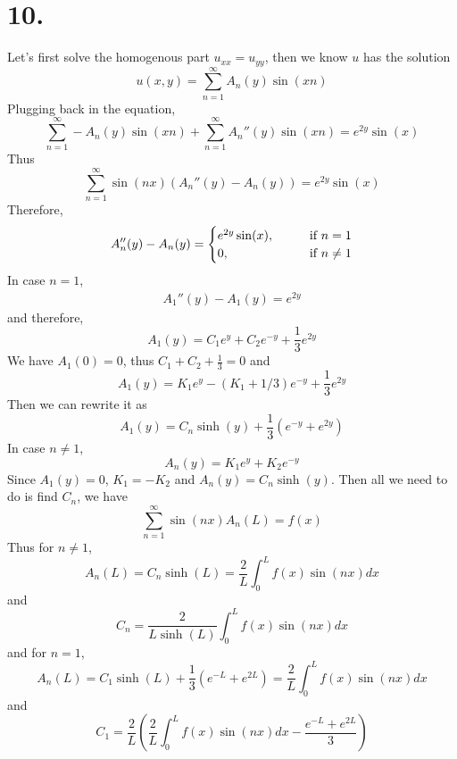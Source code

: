 \documentclass[11pt]{article}
\theoremstyle{mystyle}
\theoremstyle{definition}
\begin{document}
\section*{10.}
Let's first solve the homogenous part $u_{xx} = u_{yy}$, then we know $u$ has the solution 
\[
  u(x,y) = \sum_{n=1}^\infty A_n(y) \sin(xn)
\]
Plugging back in the equation, 
\[
  \sum_{n=1}^\infty - A_n(y) \sin(xn) + \sum_{n=1}^\infty A_n''(y) \sin(xn) = e^{2y}\sin(x)
\]
Thus 
\[
  \sum_{n=1}^\infty \sin(nx)(A_n''(y) - A_n(y)) = e^{2y}\sin(x)
\]
Therefore, 
\[
  A_n''(y) - A_n(y) = 
  \begin{cases}
    e^{2y} \sin(x), \indent &\text{ if } n = 1 \\
    0, \indent &\text{ if } n \ne 1
  \end{cases}
\]
In case $n=1$, 
\begin{align*}
  A_1''(y) - A_1(y) = e^{2y}
\end{align*}
and therefore, 
\[
  A_1(y) = C_1e^y + C_2e^{-y} + \displaystyle\frac{1}{3} e^{2y}
\]
We have $A_1(0) = 0$, thus $C_1 + C_2 +\displaystyle\frac{1}{3}=0$
and 
\[
  A_1(y) = K_1 e^y - (K_1 + 1/3)e^{-y} + \displaystyle\frac{1}{3}e^{2y}
\]
Then we can rewrite it as 
\[
  A_1(y) = C_n \sinh(y) + \displaystyle\frac{1}{3}(e^{-y} + e^{2y})
\]
In case $n\ne 1$, 
\[
  A_n(y) = K_1 e^y + K_2 e^{-y}
\]
Since $A_1(y) = 0$, $K_1 = - K_2$ and $A_n(y) = C_n \sinh(y)$.
Then all we need to do is find $C_n$, we have 
\[
  \sum_{n=1}^\infty \sin(nx) A_n(L) = f(x) 
\]
Thus for $n\ne 1$, 
\[
  A_n(L) = C_n \sinh(L) = \displaystyle\frac{2}{L} \int_0^L f(x) \sin(nx) dx  
\]
and 
\[
  C_n = \displaystyle\frac{2}{L\sinh(L)} \int_0^L f(x) \sin(nx) dx  
\]
and for $n = 1$, 
\[
  A_n(L) = C_1 \sinh(L) + \displaystyle\frac{1}{3} (e^{-L} + e^{2L}) = \displaystyle\frac{2}{L} \int_0^L f(x) \sin(nx) dx  
\]
and 
\[
  C_1 = \displaystyle\frac{2}{L} \left( \displaystyle\frac{2}{L}\int_0^L f(x) \sin(nx) dx  - \displaystyle\frac{e^{-L} + e^{2L}}{3}\right)
\]
\end{document}
